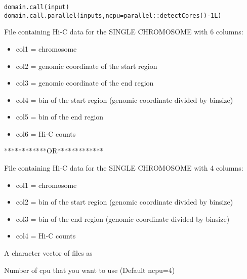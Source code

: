 \documentclass[a4paper]{book}
\begin{document}
%
\begin{Usage}
\begin{verbatim}
domain.call(input)
domain.call.parallel(inputs,ncpu=parallel::detectCores()-1L)
\end{verbatim}
\end{Usage}
%
\begin{Arguments}
\begin{ldescription}
\item[\code{input}] 
File containing Hi-C data for the SINGLE CHROMOSOME with 6 columns:
\begin{itemize}

\item col1 = chromosome
\item col2 = genomic coordinate of the start region
\item col3 = genomic coordinate of the end region
\item col4 = bin of the start region (genomic coordinate divided by binsize)
\item col5 = bin of the end region
\item col6 = Hi-C counts

\end{itemize}

************OR*************

File containing Hi-C data for the SINGLE CHROMOSOME with 4 columns:
\begin{itemize}

\item col1 = chromosome
\item col2 = bin of the start region (genomic coordinate divided by binsize)
\item col3 = bin of the end region (genomic coordinate divided by binsize)
\item col4 = Hi-C counts

\end{itemize}


\item[\code{inputs}] 
A character vector of files as 

\item[\code{ncpu}] 
Number of cpu that you want to use (Default ncpu=4)


\end{ldescription}
\end{Arguments}
%
\end{document}
